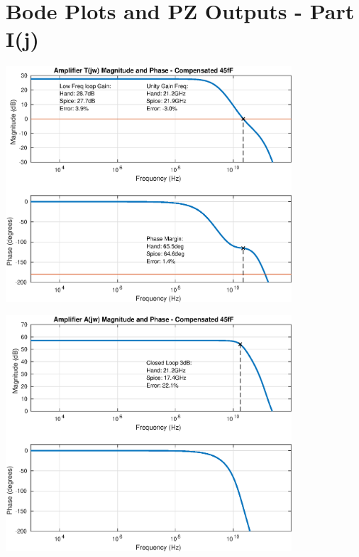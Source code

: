 \documentclass[12pt,a4paper]{article}
\begin{document}
\section{Bode Plots and PZ Outputs - Part I(j)}

	\includegraphics[width=0.8\textwidth]{plots/part_j_t.eps}

\pagebreak

{\centering
	\includegraphics[width=0.8\textwidth]{plots/part_j_a.eps}
\par}
\end{document}
